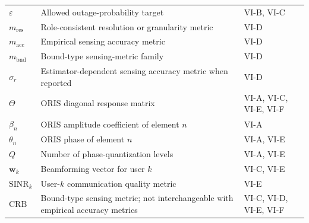 \begin{table}[!t]
\begin{tabularx}{\columnwidth}{@{}>{\raggedright\arraybackslash}p{1.85cm}>{\raggedright\arraybackslash}X>{\raggedright\arraybackslash}p{1.55cm}@{}}
        $\varepsilon$        & Allowed outage-probability target                                                                            & VI-B, VI-C             \\
        $m_{\text{res}}$     & Role-consistent resolution or granularity metric                                                             & VI-D                   \\
        $m_{\text{acc}}$     & Empirical sensing accuracy metric                                                                            & VI-D                   \\
        $m_{\text{bnd}}$     & Bound-type sensing-metric family                                                                             & VI-D                   \\
        $\sigma_r$           & Estimator-dependent sensing accuracy metric when reported                                                    & VI-D                   \\
        $\Theta$             & ORIS diagonal response matrix                                                                                & VI-A, VI-C, VI-E, VI-F \\
        $\beta_n$            & ORIS amplitude coefficient of element $n$                                                                    & VI-A                   \\
        $\theta_n$           & ORIS phase of element $n$                                                                                    & VI-A, VI-E             \\
        $Q$                  & Number of phase-quantization levels                                                                          & VI-A, VI-E             \\
        $\mathbf{w}_k$       & Beamforming vector for user $k$                                                                              & VI-C, VI-E             \\
        $\mathrm{SINR}_k$    & User-$k$ communication quality metric                                                                        & VI-E                   \\
        $\mathrm{CRB}$       & Bound-type sensing metric; not interchangeable with empirical accuracy metrics                               & VI-C, VI-D, VI-E, VI-F \\
        \bottomrule
    \end{tabularx}
\end{table}

